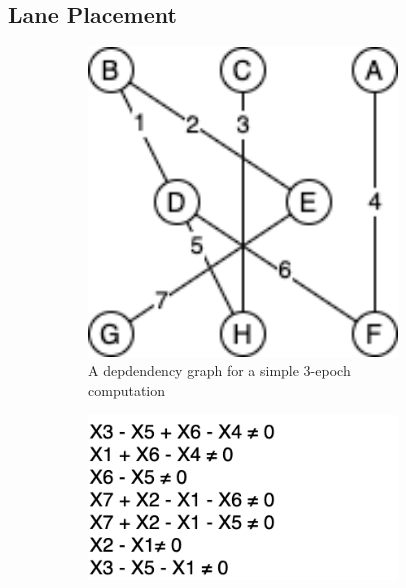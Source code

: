 \subsection{Lane Placement} 
\begin{figure}
    \begin{subfigure}{0.24\textwidth}
        \includegraphics[width=0.9\textwidth]{figures/hypergraph_coloring/small_dependency_graph.drawio.png}
        \caption{A depdendency graph for a simple 3-epoch computation}\label{fig:dependency-graph}
    \end{subfigure}
    \begin{subfigure}{0.24\textwidth}
        \includegraphics[width=0.9\textwidth]{figures/hypergraph_coloring/hypergraph_relations.drawio.png}

\end{subfigure}
\end{figure}

